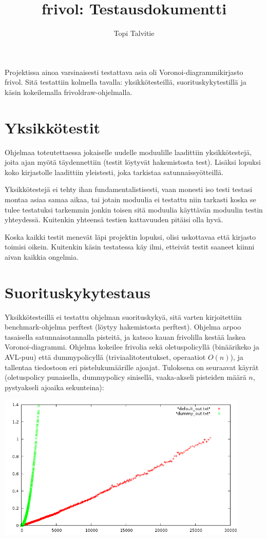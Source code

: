 \documentclass[a4paper, 11pt, finnish]{article}
\author{Topi Talvitie}
\title{frivol: Testausdokumentti}
\begin{document}
\maketitle

Projektissa ainoa varsinaisesti testattava asia oli Voronoi-diagrammikirjasto frivol. Sitä testattiin kolmella tavalla: yksikkötesteillä, suorituskykytestillä ja käsin kokeilemalla frivoldraw-ohjelmalla.

\section*{Yksikkötestit}
Ohjelmaa toteutettaessa jokaiselle uudelle moduulille laadittiin yksikkötestejä, joita ajan myötä täydennettiin (testit löytyvät hakemistosta test). Lisäksi lopuksi koko kirjastolle laadittiin yleistesti, joka tarkistaa satunnaissyötteillä.

Yksikkötestejä ei tehty ihan fundamentalistisesti, vaan monesti iso testi testasi montaa asiaa samaa aikaa, tai jotain moduulia ei testattu niin tarkasti koska se tulee testatuksi tarkemmin jonkin toisen sitä moduulia käyttävän moduulin testin yhteydessä. Kuitenkin yhteensä testien kattavuuden pitäisi olla hyvä.

Koska kaikki testit menevät läpi projektin lopuksi, olisi uskottavaa että kirjasto toimisi oikein. Kuitenkin käsin testatessa käy ilmi, etteivät testit saaneet kiinni aivan kaikkia ongelmia.

\section*{Suorituskykytestaus}
Yksikkötesteillä ei testattu ohjelman suorituskykyä, sitä varten kirjoitettiin benchmark-ohjelma perftest (löytyy hakemistosta perftest). Ohjelma arpoo tasaisella satunnaisotannalla pisteitä, ja katsoo kauan frivolilla kestää laskea Voronoi-diagrammi. Ohjelma kokeilee frivolia sekä oletuspolicyllä (binäärikeko ja AVL-puu) että dummypolicyllä (triviaalitoteutukset, operaatiot $O(n)$), ja tallentaa tiedostoon eri pistelukumäärille ajoajat. Tuloksena on seuraavat käyrät (oletuspolicy punaisella, dummypolicy sinisellä, vaaka-akseli pisteiden määrä $n$, pystyakseli ajoaika sekunteina):

\includegraphics[width=12cm]{perftest.png}
\end{document}
